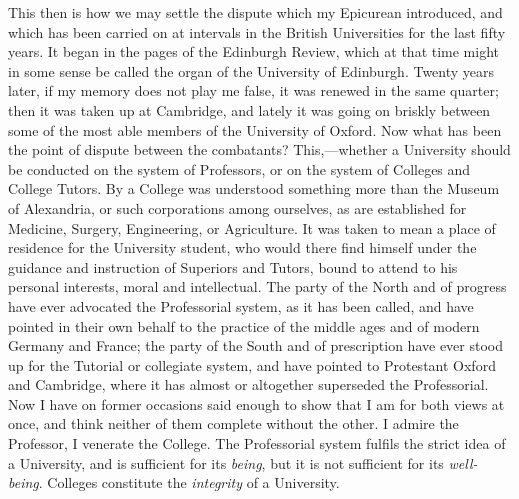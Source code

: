 This then is how we may settle
the dispute which my Epicurean introduced, and which has been carried
on at intervals in the British Universities for the last fifty years.
It began in the pages of the Edinburgh Review, which at that time
might in some sense be called the organ of the University of
Edinburgh. Twenty years later, if my memory does not play me false, it
was renewed in the same quarter; then it was taken up at Cambridge,
and lately it was going on briskly between some of the most able
members of the University of Oxford. Now what has been the point of
dispute between the combatants? This,—whether a University should be
conducted on the system of Professors, or on the system of Colleges
and College Tutors. By a College was understood something more
than the Museum of Alexandria, or such corporations among ourselves,
as are established for Medicine, Surgery, Engineering, or Agriculture.
It was taken to mean a place of residence for the University student,
who would there find himself under the guidance and instruction of
Superiors and Tutors, bound to attend to his personal interests, moral
and intellectual. The party of the North and of progress have ever
advocated the Professorial system, as it has been called, and have
pointed in their own behalf to the practice of the middle ages and of
modern Germany and France; the party of the South and of prescription
have ever stood up for the Tutorial or collegiate system, and have
pointed to Protestant Oxford and Cambridge, where it has almost or
altogether superseded the Professorial. Now I have on former occasions
said enough to show that I am for both views at once, and think
neither of them complete without the other. I admire the Professor, I
venerate the College. The Professorial system fulfils the strict idea
of a University, and is sufficient for its \emph{being}, but it is not
sufficient for its \emph{well-being}. Colleges constitute the \emph{integrity}
of a University.

